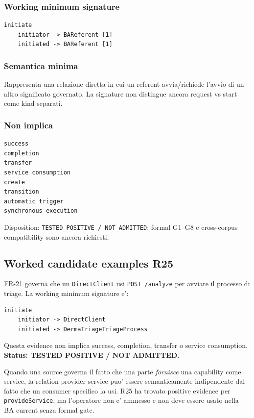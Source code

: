\documentclass[11pt,a4paper]{article}
\begin{document}
\subsubsection{Working minimum signature}
\begin{lstlisting}
initiate
    initiator -> BAReferent [1]
    initiated -> BAReferent [1]
\end{lstlisting}

\subsubsection{Semantica minima}
Rappresenta una relazione diretta in cui un referent avvia/richiede l'avvio di un altro significato governato. La signature non distingue ancora request vs start come kind separati.

\subsubsection{Non implica}
\begin{lstlisting}
success
completion
transfer
service consumption
create
transition
automatic trigger
synchronous execution
\end{lstlisting}

Disposition: \texttt{TESTED\_POSITIVE / NOT\_ADMITTED}; formal G1--G8 e cross-corpus compatibility sono ancora richiesti.


\subsection{Worked candidate examples R25}
\begin{ddtaexample}[title={CC-04 initiate - DermaTriage FR-21}]
FR-21 governa che un \texttt{DirectClient} usi \texttt{POST /analyze} per avviare il processo di triage. La working minimum signature e':
\begin{lstlisting}
initiate
    initiator -> DirectClient
    initiated -> DermaTriageTriageProcess
\end{lstlisting}
Questa evidence non implica success, completion, transfer o service consumption. \textbf{Status: TESTED POSITIVE / NOT ADMITTED.}
\end{ddtaexample}

\begin{ddtaexample}[title={CC-02 provideService - provider/service relation}]
Quando una source governa il fatto che una parte \emph{fornisce} una capability come service, la relation provider-service puo' essere semanticamente indipendente dal fatto che un consumer specifico la usi. R25 ha trovato positive evidence per \texttt{provideService}, ma l'operatore non e' ammesso e non deve essere usato nella BA current senza formal gate.
\end{ddtaexample}
\end{document}
